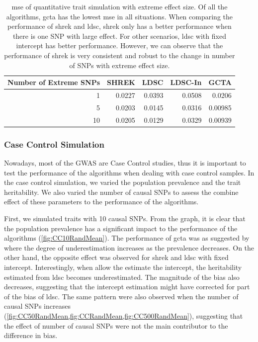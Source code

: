 		\begin{table}
			\centering
			\begin{tabular}{rrrrr}
				\toprule
				Number of Extreme SNPs&	SHREK&	LDSC&	LDSC-In&	GCTA \\
				\midrule
				1	&	0.0227	&	0.0393	&	0.0508	&	0.0206\\
				5	&	0.0203	&	0.0145	&	0.0316	&	0.00985\\
				10	&	0.0205	&	0.0129	&	0.0329	&	0.00939\\
				\bottomrule
			\end{tabular}
			\caption[MSE of Quantitative Trait Simulation with Extreme Effect Size]{
				\gls{mse} of quantitative trait simulation with extreme effect size.
				Of all the algorithms, \gls{gcta} has the lowest \gls{mse} in all situations.
				When comparing the performance of \gls{shrek} and \gls{ldsc}, \gls{shrek} only has a better performance when there is one \gls{SNP} with large effect. 
				For other scenarios, \gls{ldsc} with fixed intercept has better performance.
				However, we can observe that the performance of \gls{shrek} is very consistent and robust to the change in number of \glspl{SNP} with extreme effect size.
				}
			\label{tab:mseEx100c}
		\end{table}
		
		\subsubsection{Case Control Simulation}
		
		Nowadays, most of the \gls{GWAS} are Case Control studies, thus it is important to test the performance of the algorithms when dealing with case control samples. 
		In the case control simulation, we varied the population prevalence and the trait heritability. 
		We also varied the number of causal \glspl{SNP} to assess the combine effect of these parameters to the performance of the algorithms.
		
		First, we simulated traits with 10 causal \glspl{SNP}.
		From the graph, it is clear that the population prevalence has a significant impact to the performance of the algorithms (\cref{fig:CC10RandMean}). 
		The performance of \gls{gcta} was as suggested by \citet{Golan2014} where the degree of underestimation increases as the prevalence decreases.
		On the other hand, the opposite effect was observed for \gls{shrek} and \gls{ldsc} with fixed intercept.
		Interestingly, when allow the estimate the intercept, the heritability estimated from \gls{ldsc} becomes underestimated. 
		The magnitude of the bias also decreases, suggesting that the intercept estimation might have corrected for part of the bias of \gls{ldsc}.
		The same pattern were also observed when the number of causal \glspl{SNP} increases (\cref{fig:CC50RandMean,fig:CCRandMean,fig:CC500RandMean}), suggesting that the effect of number of causal \glspl{SNP} were not the main contributor to the difference in bias. 
		
